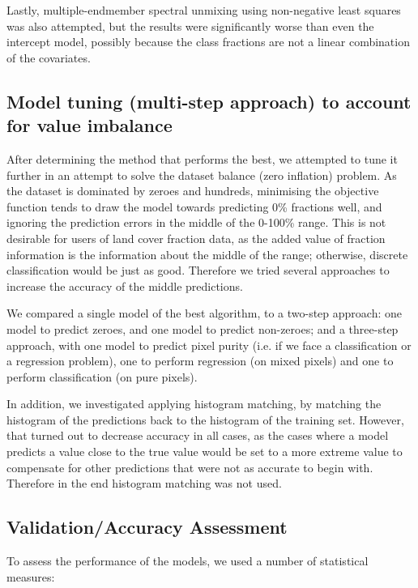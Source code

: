 \documentclass[a4paper,10pt]{article}
\begin{document}
Lastly, multiple-endmember spectral unmixing using non-negative least squares was also attempted, but the results were significantly worse than even the intercept model, possibly because the class fractions are not a linear combination of the covariates.

\subsection{Model tuning (multi-step approach) to account for value imbalance}
\label{sec-multistep}

After determining the method that performs the best, we attempted to tune it further in an attempt to solve the dataset balance (zero inflation) problem.
As the dataset is dominated by zeroes and hundreds, minimising the objective function tends to draw the model towards predicting 0\% fractions well, and ignoring the prediction errors in the middle of the 0-100\% range.
This is not desirable for users of land cover fraction data, as the added value of fraction information is the information about the middle of the range; otherwise, discrete classification would be just as good.
Therefore we tried several approaches to increase the accuracy of the middle predictions.

We compared a single model of the best algorithm, to a two-step approach: one model to predict zeroes, and one model to predict non-zeroes; and a three-step approach, with one model to predict pixel purity (i.e. if we face a classification or a regression problem), one to perform regression (on mixed pixels) and one to perform classification (on pure pixels).

In addition, we investigated applying histogram matching, by matching the histogram of the predictions back to the histogram of the training set.
However, that turned out to decrease accuracy in all cases, as the cases where a model predicts a value close to the true value would be set to a more extreme value to compensate for other predictions that were not as accurate to begin with.
Therefore in the end histogram matching was not used.

\subsection{Validation/Accuracy Assessment}

To assess the performance of the models, we used a number of statistical measures:
\end{document}
